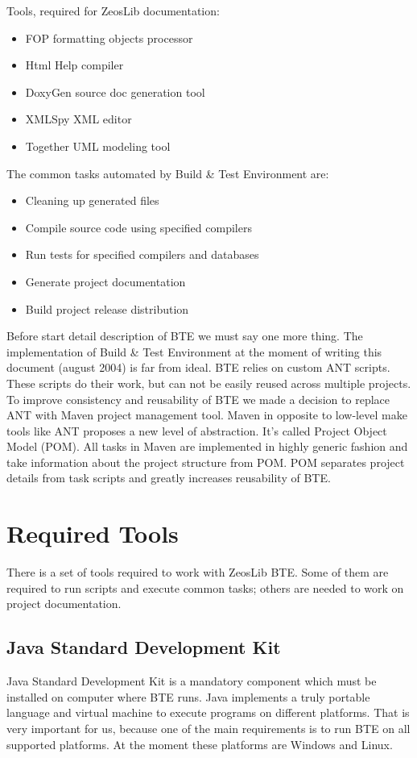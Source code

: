 \documentclass[a4paper,12pt,oneside]{book}
\begin{document}
Tools, required for ZeosLib documentation:
\begin{itemize}
  \item FOP formatting objects processor
	\item Html Help compiler
	\item DoxyGen source doc generation tool
	\item XMLSpy XML editor
	\item Together UML modeling tool
\end{itemize}

The common tasks automated by Build \& Test Environment are:
\begin{itemize}
  \item Cleaning up generated files
	\item Compile source code using specified compilers
	\item Run tests for specified compilers and databases
	\item Generate project documentation
	\item Build project release distribution
\end{itemize}

Before start detail description of BTE we must say one more thing.
The implementation of Build \& Test Environment at the moment of writing this document (august 2004) is far from ideal.
BTE relies on custom ANT scripts.
These scripts do their work, but can not be easily reused across multiple projects.
To improve consistency and reusability of BTE we made a decision to replace ANT with Maven project management tool.
Maven in opposite to low-level make tools like ANT proposes a new level of abstraction.
It’s called Project Object Model (POM).
All tasks in Maven are implemented in highly generic fashion and take information about the project structure from POM.
POM separates project details from task scripts and greatly increases reusability of BTE. 

\section{Required Tools}

There is a set of tools required to work with ZeosLib BTE.
Some of them are required to run scripts and execute common tasks; others are needed to work on project documentation.

\subsection{Java Standard Development Kit}
Java Standard Development Kit is a mandatory component which must be installed on computer where BTE runs.
Java implements a truly portable language and virtual machine to execute programs on different platforms.
That is very important for us, because one of the main requirements is to run BTE on all supported platforms.
At the moment these platforms are Windows and Linux.
\end{document}

